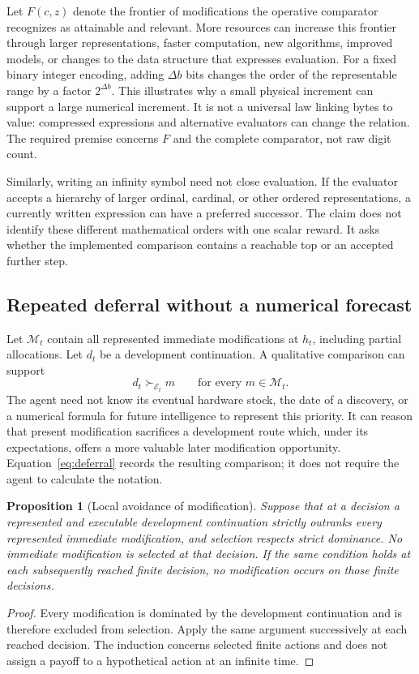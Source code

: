 \documentclass[11pt,a4paper]{article}
\newtheorem{proposition}{Proposition}
\newcommand{\E}{\mathcal{E}}
\newcommand{\M}{\mathcal{M}}
\begin{document}
Let $F(c,z)$ denote the frontier of modifications the operative comparator recognizes as attainable and relevant. More resources can increase this frontier through larger representations, faster computation, new algorithms, improved models, or changes to the data structure that expresses evaluation. For a fixed binary integer encoding, adding $\Delta b$ bits changes the order of the representable range by a factor $2^{\Delta b}$. This illustrates why a small physical increment can support a large numerical increment. It is not a universal law linking bytes to value: compressed expressions and alternative evaluators can change the relation. The required premise concerns $F$ and the complete comparator, not raw digit count.

Similarly, writing an infinity symbol need not close evaluation. If the evaluator accepts a hierarchy of larger ordinal, cardinal, or other ordered representations, a currently written expression can have a preferred successor. The claim does not identify these different mathematical orders with one scalar reward. It asks whether the implemented comparison contains a reachable top or an accepted further step.

\subsection{Repeated deferral without a numerical forecast}
Let $\M_t$ contain all represented immediate modifications at $h_t$, including partial allocations. Let $d_t$ be a development continuation. A qualitative comparison can support
\begin{equation}
 d_t\succ_{\E_t}m\qquad\text{for every }m\in\M_t.
 \label{eq:deferral}
\end{equation}
The agent need not know its eventual hardware stock, the date of a discovery, or a numerical formula for future intelligence to represent this priority. It can reason that present modification sacrifices a development route which, under its expectations, offers a more valuable later modification opportunity. Equation~\eqref{eq:deferral} records the resulting comparison; it does not require the agent to calculate the notation.

\begin{proposition}[Local avoidance of modification]
Suppose that at a decision a represented and executable development continuation strictly outranks every represented immediate modification, and selection respects strict dominance. No immediate modification is selected at that decision. If the same condition holds at each subsequently reached finite decision, no modification occurs on those finite decisions.
\end{proposition}
\begin{proof}
Every modification is dominated by the development continuation and is therefore excluded from selection. Apply the same argument successively at each reached decision. The induction concerns selected finite actions and does not assign a payoff to a hypothetical action at an infinite time.
\end{proof}
\end{document}
